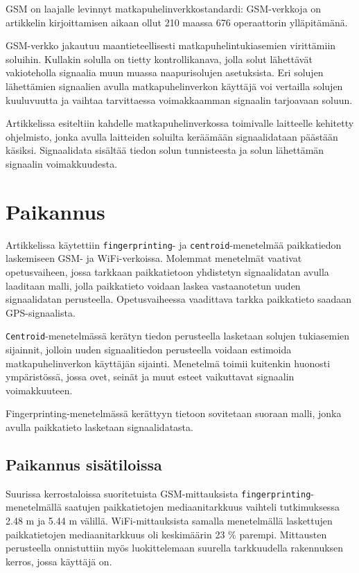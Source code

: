 \documentclass[a4paper]{scrartcl}
\begin{document}
GSM on laajalle levinnyt matkapuhelinverkkostandardi:
GSM-verkkoja on artikkelin kirjoittamisen aikaan ollut 210
maassa 676 operaattorin ylläpitämänä.

GSM-verkko jakautuu maantieteellisesti
matkapuhelintukiasemien virittämiin soluihin. Kullakin
solulla on tietty kontrollikanava, jolla solut lähettävät
vakioteholla signaalia muun muassa naapurisolujen
asetuksista. Eri solujen lähettämien signaalien avulla
matkapuhelinverkon käyttäjä voi vertailla solujen
kuuluvuutta ja vaihtaa tarvittaessa voimakkaamman signaalin
tarjoavaan soluun.

Artikkelissa esiteltiin kahdelle matkapuhelinverkossa
toimivalle laitteelle kehitetty ohjelmisto, jonka avulla
laitteiden soluilta keräämään signaalidataan päästään
käsiksi. Signaalidata sisältää tiedon solun tunnisteesta ja
solun lähettämän signaalin voimakkuudesta.

\section{Paikannus}

Artikkelissa käytettiin \texttt{fingerprinting}- ja
\texttt{centroid}-menetelmää paikkatiedon laskemiseen GSM-
ja WiFi-verkoissa. Molemmat menetelmät vaativat
opetusvaiheen, jossa tarkkaan paikkatietoon yhdistetyn
signaalidatan avulla laaditaan malli, jolla paikkatieto
voidaan laskea vastaanotetun uuden signaalidatan
perusteella. Opetusvaiheessa vaadittava tarkka paikkatieto
saadaan GPS-signaalista.

\texttt{Centroid}-menetelmässä kerätyn tiedon perusteella
lasketaan solujen tukiasemien sijainnit, jolloin uuden
signaalitiedon perusteella voidaan estimoida
matkapuhelinverkon käyttäjän sijainti. Menetelmä toimii
kuitenkin huonosti ympäristössä, jossa ovet, seinät ja muut
esteet vaikuttavat signaalin voimakkuuteen.

Fingerprinting-menetelmässä kerättyyn tietoon sovitetaan
suoraan malli, jonka avulla paikkatieto lasketaan
signaalidatasta.

\subsection{Paikannus sisätiloissa}

Suurissa kerrostaloissa suoritetuista GSM-mittauksista
\texttt{fingerprinting}-menetelmällä saatujen paikkatietojen
mediaanitarkkuus vaihteli tutkimuksessa 2.48 m ja 5.44 m
välillä. WiFi-mittauksista samalla menetelmällä laskettujen
paikkatietojen mediaanitarkkuus oli keskimäärin 23 \%
parempi. Mittausten perusteella onnistuttiin myös
luokittelemaan suurella tarkkuudella rakennuksen kerros,
jossa käyttäjä on.
\end{document}
